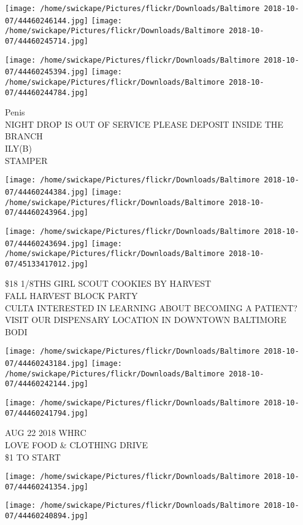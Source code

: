 \documentclass[10pt,letterpaper]{article}
\begin{document}
\texttt{[image: /home/swickape/Pictures/flickr/Downloads/Baltimore 2018-10-07/44460246144.jpg]}
\texttt{[image: /home/swickape/Pictures/flickr/Downloads/Baltimore 2018-10-07/44460245714.jpg]}

\texttt{[image: /home/swickape/Pictures/flickr/Downloads/Baltimore 2018-10-07/44460245394.jpg]}
\texttt{[image: /home/swickape/Pictures/flickr/Downloads/Baltimore 2018-10-07/44460244784.jpg]}

Penis\\
NIGHT DROP IS OUT OF SERVICE PLEASE DEPOSIT INSIDE THE BRANCH\\
ILY(B)\\
STAMPER\\
\pagebreak

\texttt{[image: /home/swickape/Pictures/flickr/Downloads/Baltimore 2018-10-07/44460244384.jpg]}
\texttt{[image: /home/swickape/Pictures/flickr/Downloads/Baltimore 2018-10-07/44460243964.jpg]}

\texttt{[image: /home/swickape/Pictures/flickr/Downloads/Baltimore 2018-10-07/44460243694.jpg]}
\texttt{[image: /home/swickape/Pictures/flickr/Downloads/Baltimore 2018-10-07/45133417012.jpg]}

\$18 1/8THS GIRL SCOUT COOKIES BY HARVEST\\
FALL HARVEST BLOCK PARTY\\
CULTA INTERESTED IN LEARNING ABOUT BECOMING A PATIENT?  VISIT OUR DISPENSARY LOCATION IN DOWNTOWN BALTIMORE\\
BODI\\
\pagebreak

\texttt{[image: /home/swickape/Pictures/flickr/Downloads/Baltimore 2018-10-07/44460243184.jpg]}
\texttt{[image: /home/swickape/Pictures/flickr/Downloads/Baltimore 2018-10-07/44460242144.jpg]}

\texttt{[image: /home/swickape/Pictures/flickr/Downloads/Baltimore 2018-10-07/44460241794.jpg]}

AUG 22 2018 WHRC\\
LOVE FOOD \& CLOTHING DRIVE\\
\$1 TO START\\
\pagebreak

\texttt{[image: /home/swickape/Pictures/flickr/Downloads/Baltimore 2018-10-07/44460241354.jpg]}

\vspace{0.25in}
\texttt{[image: /home/swickape/Pictures/flickr/Downloads/Baltimore 2018-10-07/44460240894.jpg]}
\end{document}
